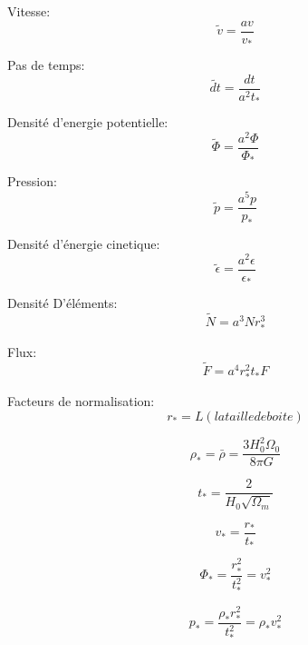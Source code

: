Vitesse:
\begin{equation}
\tilde{v}=\frac{av}{v_*}
\end{equation}

Pas de temps:
\begin{equation}
\tilde{dt}=\frac{dt}{a^2t_*}
\end{equation}

Densité d'energie potentielle:
\begin{equation}
\tilde{\Phi}=\frac{a^2 \Phi}{\Phi_*}
\end{equation}

Pression:
\begin{equation}
\tilde{p}=\frac{a^5 p}{p_*}
\end{equation}

Densité d’énergie cinetique:
\begin{equation}
\tilde{\epsilon}=\frac{a^2 \epsilon}{\epsilon_*}
\end{equation}

Densité D’éléments:
\begin{equation}
\tilde{N}=a^3 N r_*^3
\end{equation}

Flux:
\begin{equation}
\tilde{F}=a^4 r_*^2 t_* F
\end{equation}



Facteurs de normalisation:
\begin{equation}
r_*=L (la taille de boite)
\end{equation}

\begin{equation}
\rho_* = \bar{\rho} = \frac{3H_0^2 \Omega_0}{8\pi G}
\end{equation}

\begin{equation}
t_* = \frac{2}{H_0 \sqrt{\Omega_m}}
\end{equation}

\begin{equation}
v_* = \frac{r_*}{t_*}
\end{equation}

\begin{equation}
\Phi_* = \frac{r_*^2}{t_*^2} = v_*^2
\end{equation}

\begin{equation}
p_* = \frac{\rho_* r_*^2}{t_*^2} = \rho_* v_*^2
\end{equation}

